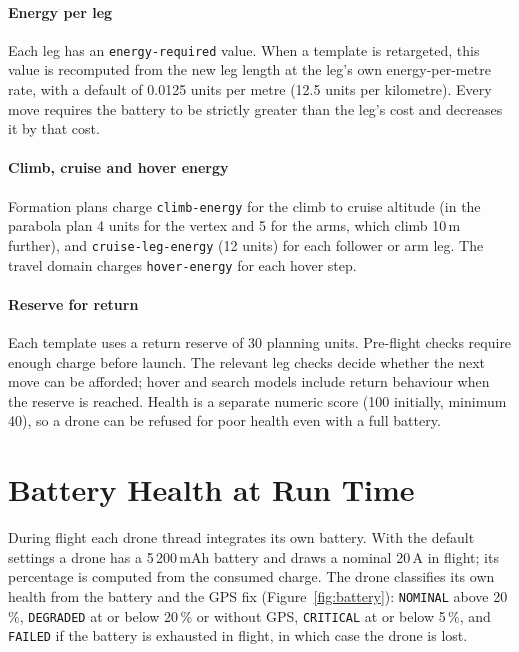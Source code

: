 \documentclass[11pt,a4paper,oneside]{report}
\newcommand{\code}[1]{\texttt{#1}}
\begin{document}
\paragraph{Energy per leg}
Each leg has an \code{energy-required} value. When a template is retargeted, this value is
recomputed from the new leg length at the leg's own energy-per-metre rate, with a default of
0.0125 units per metre (12.5 units per kilometre). Every move requires the battery to be
strictly greater than the leg's cost and decreases it by that cost.

\paragraph{Climb, cruise and hover energy}
Formation plans charge \code{climb-energy} for the climb to cruise altitude (in the parabola
plan 4 units for the vertex and 5 for the arms, which climb 10\,m further), and
\code{cruise-leg-energy} (12 units) for each follower or arm leg. The travel domain charges
\code{hover-energy} for each hover step.

\paragraph{Reserve for return}
Each template uses a return reserve of 30 planning units. Pre-flight checks
require enough charge before launch. The relevant leg checks decide whether
the next move can be afforded; hover and search models include return behaviour
when the reserve is reached. Health is a separate
numeric score (100 initially, minimum 40), so a drone can be refused for poor health even with a
full battery.

\section{Battery Health at Run Time}
During flight each drone thread integrates its own battery. With the default settings a drone has
a 5\,200\,mAh battery and draws a nominal 20\,A in flight; its percentage is computed from the
consumed charge. The drone classifies its own health from the battery and the GPS fix
(Figure~\ref{fig:battery}): \code{NOMINAL} above 20\,\%, \code{DEGRADED} at or below 20\,\% or
without GPS, \code{CRITICAL} at or below 5\,\%, and \code{FAILED} if the battery is exhausted in
flight, in which case the drone is lost.
\end{document}
